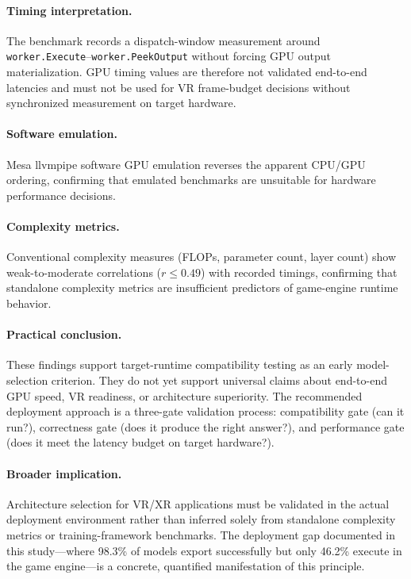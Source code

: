 \documentclass[10pt,twocolumn,letterpaper]{article}
\begin{document}
\paragraph{Timing interpretation.}
The benchmark records a dispatch-window measurement around \texttt{worker.Execute}--\texttt{worker.PeekOutput} without forcing GPU output materialization. GPU timing values are therefore not validated end-to-end latencies and must not be used for VR frame-budget decisions without synchronized measurement on target hardware.

\paragraph{Software emulation.}
Mesa llvmpipe software GPU emulation reverses the apparent CPU/GPU ordering, confirming that emulated benchmarks are unsuitable for hardware performance decisions.

\paragraph{Complexity metrics.}
Conventional complexity measures (FLOPs, parameter count, layer count) show weak-to-moderate correlations ($r \leq 0.49$) with recorded timings, confirming that standalone complexity metrics are insufficient predictors of game-engine runtime behavior.

\paragraph{Practical conclusion.}
These findings support target-runtime compatibility testing as an early model-selection criterion. They do not yet support universal claims about end-to-end GPU speed, VR readiness, or architecture superiority. The recommended deployment approach is a three-gate validation process: compatibility gate (can it run?), correctness gate (does it produce the right answer?), and performance gate (does it meet the latency budget on target hardware?).

\paragraph{Broader implication.}
Architecture selection for VR/XR applications must be validated in the actual deployment environment rather than inferred solely from standalone complexity metrics or training-framework benchmarks. The deployment gap documented in this study---where 98.3\% of models export successfully but only 46.2\% execute in the game engine---is a concrete, quantified manifestation of this principle.
\end{document}
